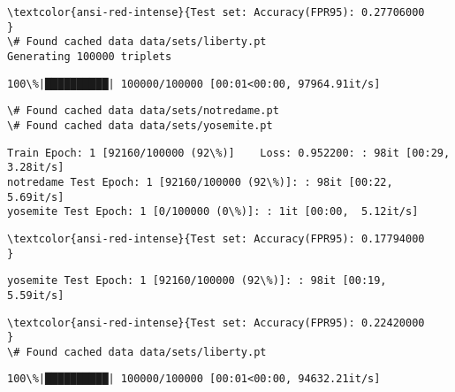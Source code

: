 \documentclass[11pt]{article}
\begin{document}
    \begin{Verbatim}[commandchars=\\\{\}]
\textcolor{ansi-red-intense}{Test set: Accuracy(FPR95): 0.27706000
}
\# Found cached data data/sets/liberty.pt
Generating 100000 triplets

    \end{Verbatim}

    \begin{Verbatim}[commandchars=\\\{\}]
100\%|██████████| 100000/100000 [00:01<00:00, 97964.91it/s]

    \end{Verbatim}

    \begin{Verbatim}[commandchars=\\\{\}]
\# Found cached data data/sets/notredame.pt
\# Found cached data data/sets/yosemite.pt

    \end{Verbatim}

    \begin{Verbatim}[commandchars=\\\{\}]
Train Epoch: 1 [92160/100000 (92\%)]	Loss: 0.952200: : 98it [00:29,  3.28it/s]
notredame Test Epoch: 1 [92160/100000 (92\%)]: : 98it [00:22,  5.69it/s]
yosemite Test Epoch: 1 [0/100000 (0\%)]: : 1it [00:00,  5.12it/s]
    \end{Verbatim}

    \begin{Verbatim}[commandchars=\\\{\}]
\textcolor{ansi-red-intense}{Test set: Accuracy(FPR95): 0.17794000
}

    \end{Verbatim}

    \begin{Verbatim}[commandchars=\\\{\}]
yosemite Test Epoch: 1 [92160/100000 (92\%)]: : 98it [00:19,  5.59it/s]

    \end{Verbatim}

    \begin{Verbatim}[commandchars=\\\{\}]
\textcolor{ansi-red-intense}{Test set: Accuracy(FPR95): 0.22420000
}
\# Found cached data data/sets/liberty.pt

    \end{Verbatim}

    \begin{Verbatim}[commandchars=\\\{\}]
100\%|██████████| 100000/100000 [00:01<00:00, 94632.21it/s]

    \end{Verbatim}
\end{document}

